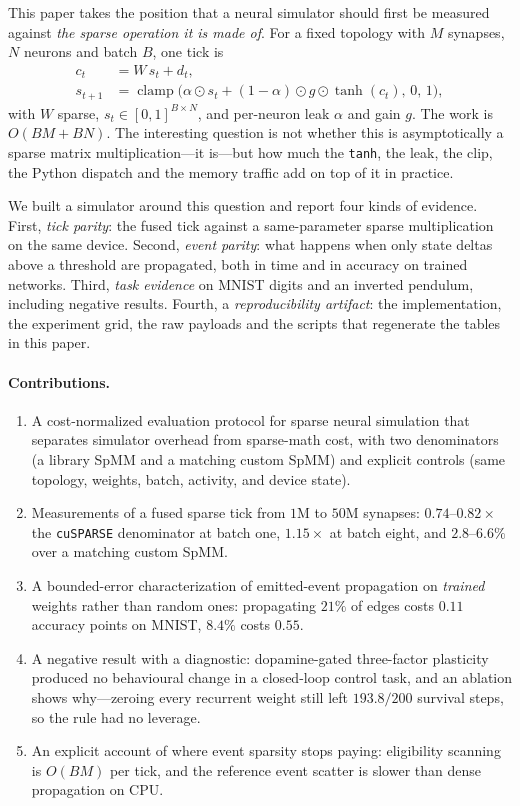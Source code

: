 \documentclass[11pt]{article}
\begin{document}
This paper takes the position that a neural simulator should first be measured
against \emph{the sparse operation it is made of}. For a fixed topology with $M$
synapses, $N$ neurons and batch $B$, one tick is
\begin{align}
  c_t &= W\,s_t + d_t, \\
  s_{t+1} &= \operatorname{clamp}\!\big(\alpha \odot s_t + (1-\alpha)\odot g\odot
             \tanh(c_t),\,0,\,1\big),
\end{align}
with $W$ sparse, $s_t\in[0,1]^{B\times N}$, and per-neuron leak $\alpha$ and gain
$g$. The work is $O(BM + BN)$. The interesting question is not whether this is
asymptotically a sparse matrix multiplication---it is---but how much the
\texttt{tanh}, the leak, the clip, the Python dispatch and the memory traffic add
on top of it in practice.

We built a simulator around this question and report four kinds of evidence.
First, \emph{tick parity}: the fused tick against a same-parameter sparse
multiplication on the same device. Second, \emph{event parity}: what happens when
only state deltas above a threshold are propagated, both in time and in accuracy
on trained networks. Third, \emph{task evidence} on MNIST digits and an inverted
pendulum, including negative results. Fourth, a \emph{reproducibility artifact}:
the implementation, the experiment grid, the raw payloads and the scripts that
regenerate the tables in this paper.

\paragraph{Contributions.}
\begin{enumerate}
  \item A cost-normalized evaluation protocol for sparse neural simulation that
        separates simulator overhead from sparse-math cost, with two
        denominators (a library SpMM and a matching custom SpMM) and explicit
        controls (same topology, weights, batch, activity, and device state).
  \item Measurements of a fused sparse tick from $1$M to $50$M synapses:
        $0.74$--$0.82\times$ the \texttt{cuSPARSE} denominator at batch one,
        $1.15\times$ at batch eight, and $2.8$--$6.6\%$ over a matching custom
        SpMM.
  \item A bounded-error characterization of emitted-event propagation on
        \emph{trained} weights rather than random ones: propagating $21\%$ of
        edges costs $0.11$ accuracy points on MNIST, $8.4\%$ costs $0.55$.
  \item A negative result with a diagnostic: dopamine-gated three-factor
        plasticity produced no behavioural change in a closed-loop control task,
        and an ablation shows why---zeroing every recurrent weight still left
        $193.8/200$ survival steps, so the rule had no leverage.
  \item An explicit account of where event sparsity stops paying: eligibility
        scanning is $O(BM)$ per tick, and the reference event scatter is slower
        than dense propagation on CPU.
\end{enumerate}
\end{document}

